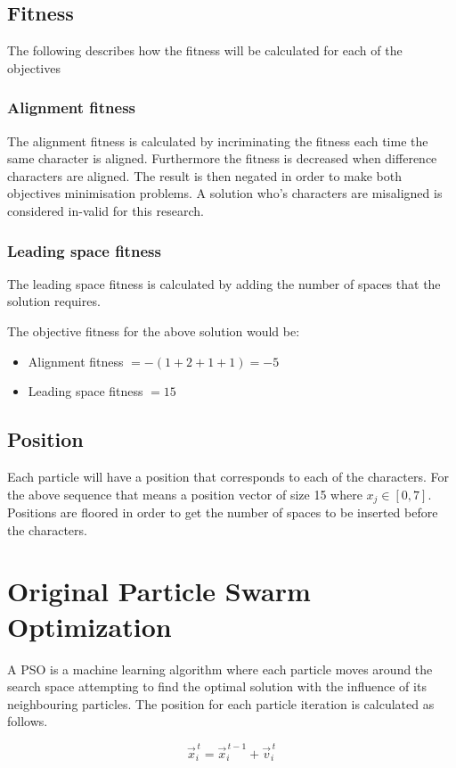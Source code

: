 \documentclass[conference]{IEEEtran}
\begin{document}
\subsection{Fitness}
\noindent The following describes how the fitness will be calculated for each of the objectives
\subsubsection{Alignment fitness}
The alignment fitness is calculated by incriminating the fitness each time the same character is aligned. Furthermore the fitness is decreased when difference characters are aligned. The result is then negated in order to make both objectives minimisation problems. A solution who's characters are misaligned is considered in-valid for this research.

\subsubsection{Leading space fitness}
The leading space fitness is calculated by adding the number of spaces that the solution requires.

The objective fitness for the above solution would be:
\begin{itemize}
	\item Alignment fitness $= -(1 + 2 + 1 + 1) = -5$
	\item Leading space fitness $= 15$
\end{itemize}
\subsection{Position}
Each particle will have a position that corresponds to each of the characters. For the above sequence that means a position vector of size 15 where $x_j \in [0, 7]$. Positions are floored in order to get the number of spaces to be inserted before the characters.


\section{Original Particle Swarm Optimization}
A \ac{PSO} is a machine learning algorithm where each particle moves around the search space attempting to find the optimal solution with the influence of its neighbouring particles. The position for each particle iteration is calculated as follows.

\begin{equation} \label{eq:pso:update-position}
\vec{x}_{i}^{\,t} = \vec{x}_{i}^{\,t-1} + \vec{v}_{i}^{\,t}
\end{equation}
\end{document}
